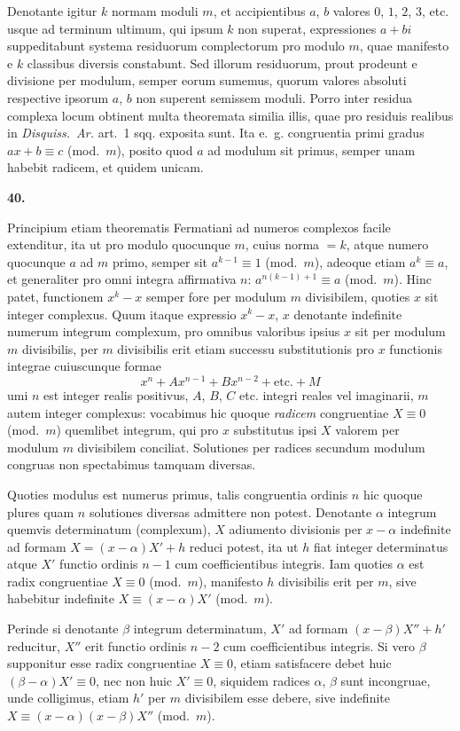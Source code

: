 \documentclass[12pt,a4paper]{article}
\newcommand{\art}[1]{\begin{center}\textbf{#1.}\end{center}}
\begin{document}
Denotante igitur $k$ normam moduli $m$, et accipientibus $a$, $b$ valores $0$, $1$, $2$, $3$, etc. usque ad terminum ultimum, qui ipsum $k$ non superat, expressiones $a+bi$ suppeditabunt systema residuorum complectorum pro modulo $m$, quae manifesto e $k$ classibus diversis constabunt. Sed illorum residuorum, prout prodeunt e divisione per modulum, semper eorum sumemus, quorum valores absoluti respective ipsorum $a$, $b$ non superent semissem moduli. Porro inter residua complexa locum obtinent multa theoremata similia illis, quae pro residuis realibus in \textit{Disquiss.~Ar.} art.~1 sqq. exposita sunt. Ita e.~g. congruentia primi gradus $ax+b\equiv c$ (mod.~$m$), posito quod $a$ ad modulum sit primus, semper unam habebit radicem, et quidem unicam.

\art{40}

Principium etiam theorematis Fermatiani ad numeros complexos facile extenditur, ita ut pro modulo quocunque $m$, cuius norma $=k$, atque numero quocunque $a$ ad $m$ primo, semper sit $a^{k-1}\equiv 1$ (mod.~$m$), adeoque etiam $a^k\equiv a$, et generaliter pro omni integra affirmativa $n$: $a^{n(k-1)+1}\equiv a$ (mod.~$m$). Hinc patet, functionem $x^k-x$ semper fore per modulum $m$ divisibilem, quoties $x$ sit integer complexus. Quum itaque expressio $x^k-x$, $x$ denotante indefinite numerum integrum complexum, pro omnibus valoribus ipsius $x$ sit per modulum $m$ divisibilis, per $m$ divisibilis erit etiam successu substitutionis pro $x$ functionis integrae cuiuscunque formae
\[x^n+Ax^{n-1}+Bx^{n-2}+\text{etc.}+M\]
umi $n$ est integer realis positivus, $A$, $B$, $C$ etc. integri reales vel imaginarii, $m$ autem integer complexus: vocabimus hic quoque \textit{radicem} congruentiae $X\equiv 0$ (mod.~$m$) quemlibet integrum, qui pro $x$ substitutus ipsi $X$ valorem per modulum $m$ divisibilem conciliat. Solutiones per radices secundum modulum congruas non spectabimus tamquam diversas.

Quoties modulus est numerus primus, talis congruentia ordinis $n$ hic quoque plures quam $n$ solutiones diversas admittere non potest. Denotante $\alpha$ integrum quemvis determinatum (complexum), $X$ adiumento divisionis per $x-\alpha$ indefinite ad formam $X=(x-\alpha)X'+h$ reduci potest, ita ut $h$ fiat integer determinatus atque $X'$ functio ordinis $n-1$ cum coefficientibus integris. Iam quoties $\alpha$ est radix congruentiae $X\equiv 0$ (mod.~$m$), manifesto $h$ divisibilis erit per $m$, sive habebitur indefinite $X\equiv (x-\alpha)X'$ (mod.~$m$).

Perinde si denotante $\beta$ integrum determinatum, $X'$ ad formam $(x-\beta)X''+h'$ reducitur, $X''$ erit functio ordinis $n-2$ cum coefficientibus integris. Si vero $\beta$ supponitur esse radix congruentiae $X\equiv 0$, etiam satisfacere debet huic $(\beta-\alpha)X'\equiv 0$, nec non huic $X'\equiv 0$, siquidem radices $\alpha$, $\beta$ sunt incongruae, unde colligimus, etiam $h'$ per $m$ divisibilem esse debere, sive indefinite $X\equiv (x-\alpha)(x-\beta)X''$ (mod.~$m$).
\end{document}
